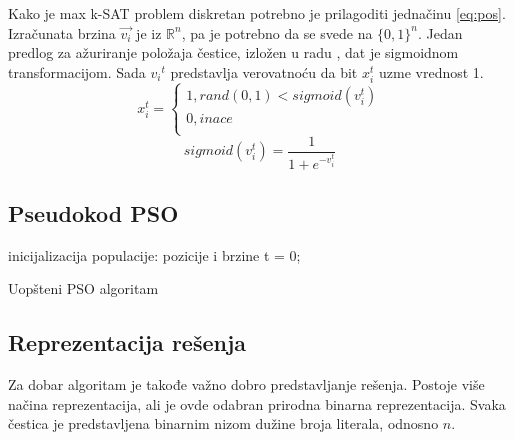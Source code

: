 \documentclass{article}
\begin{document}
Kako je max k-SAT problem diskretan potrebno je prilagoditi jednačinu \ref{eq:pos}. Izračunata brzina $\vec{v_{i}}$ je iz $\mathbb{R}^n$, pa je potrebno da se svede na $\{ 0,1 \}^n$. Jedan predlog za ažuriranje položaja čestice, izložen u radu \cite{sigmoid}, dat je sigmoidnom transformacijom. Sada ${v_{i}}^{t}$ predstavlja verovatnoću da bit $x_{i}^{t}$ uzme vrednost 1.  \\

\begin{equation}
x_{i}^{t}=\begin{cases}
               1, rand(0,1) < sigmoid(v_{i}^{t})\\
               0, inace\\
            \end{cases}
\end{equation}
\begin{equation}
sigmoid(v_{i}^{t}) = \frac{1}{1+e^{-v_{i}^{t}}}
\end{equation}
 
 
\subsection{Pseudokod PSO}

\begin{algorithm}[H]
\SetAlgoLined
{}

\BlankLine
 inicijalizacija populacije: pozicije i brzine\;
 t = 0; \\
 \caption{Uopšteni PSO algoritam}
\end{algorithm}


\subsection{Reprezentacija rešenja}
Za dobar algoritam je takođe važno dobro predstavljanje rešenja. Postoje više načina reprezentacija, ali je ovde odabran prirodna binarna reprezentacija. Svaka čestica je predstavljena binarnim nizom dužine broja literala, odnosno $n$.
\end{document}
